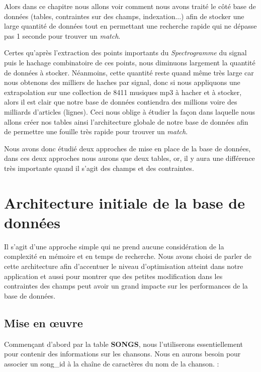 \documentclass[11pt, report, french]{scrreprt}
\begin{document}
\vspace{0.5cm}
Alors dans ce chapitre nous allons voir comment nous avons traité le côté base de données (tables, contraintes sur des champs, indexation...) afin de stocker une large quantité de données tout en permettant une recherche rapide qui ne dépasse pas 1 seconde pour trouver un \textit{match}.

Certes qu'après l'extraction des points importants du \textit{Spectrogramme} du signal puis le hachage combinatoire de ces points, nous diminuons largement la quantité de données à stocker. Néanmoins, cette quantité reste quand même très large car nous obtenons des milliers de haches par signal, donc si nous appliquons une extrapolation sur une collection de 8411 musiques mp3 à hacher et à stocker, alors il est clair que notre base de données contiendra des millions voire des milliards d'articles (lignes). Ceci nous oblige à étudier la façon dans laquelle nous allons créer nos tables ainsi l'architecture globale de notre base de données afin de permettre une fouille très rapide pour trouver un \textit{match}.\\\par

Nous avons donc étudié deux approches de mise en place de la base de données, dans ces deux approches nous aurons que deux tables, or, il y aura une différence très importante quand il s'agit des champs et des contraintes.

\section{Architecture initiale de la base de données}
Il s'agit d'une approche simple qui ne prend aucune considération de la complexité en mémoire et en temps de recherche. Nous avons choisi de parler de cette architecture afin d'accentuer le niveau d'optimisation atteint dans notre application et aussi pour montrer que des petites modification dans les contraintes des champs peut avoir un grand impacte sur les performances de la base de données. 

\subsection{Mise en œuvre}
Commençant d'abord par la table \textbf{SONGS}, nous l'utiliserons essentiellement pour contenir des informations sur les chansons. Nous en aurons besoin pour associer un song\_id à la chaîne de caractères du nom de la chanson. :\\
\end{document}
